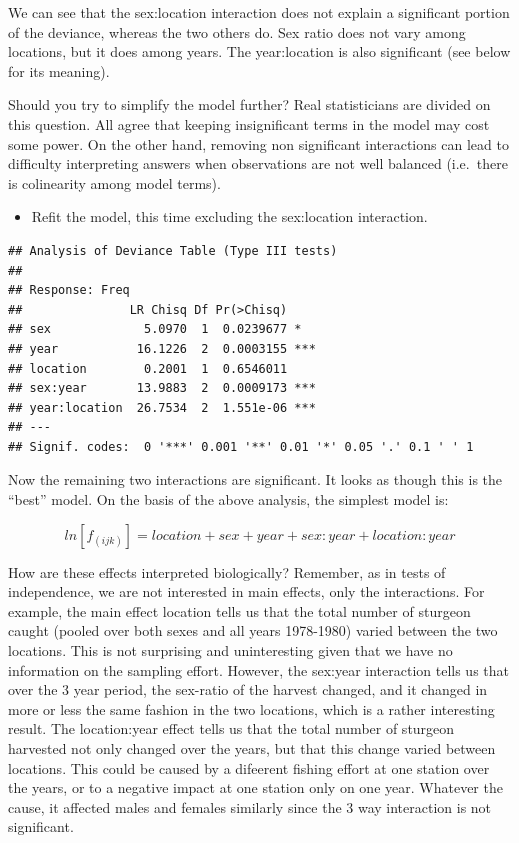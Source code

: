 \documentclass[
  12pt,
]{book}
\providecommand{\tightlist}{%
  \setlength{\itemsep}{0pt}\setlength{\parskip}{0pt}}
\begin{document}
We can see that the sex:location interaction does not explain a significant portion of the deviance, whereas the two others do. Sex ratio does not vary among locations, but it does among years. The year:location is also significant (see below for its meaning).

Should you try to simplify the model further? Real statisticians are divided on this question. All agree that keeping insignificant terms in the model may cost some power. On the other hand, removing non significant interactions can lead to difficulty interpreting answers when observations are not well balanced (i.e.~there is colinearity among model terms).

\begin{itemize}
\tightlist
\item
  Refit the model, this time excluding the sex:location interaction.
\end{itemize}

\begin{verbatim}
## Analysis of Deviance Table (Type III tests)
## 
## Response: Freq
##               LR Chisq Df Pr(>Chisq)    
## sex             5.0970  1  0.0239677 *  
## year           16.1226  2  0.0003155 ***
## location        0.2001  1  0.6546011    
## sex:year       13.9883  2  0.0009173 ***
## year:location  26.7534  2  1.551e-06 ***
## ---
## Signif. codes:  0 '***' 0.001 '**' 0.01 '*' 0.05 '.' 0.1 ' ' 1
\end{verbatim}

Now the remaining two interactions are significant. It looks as though this is the ``best'' model. On the basis of the above analysis, the simplest model is:

\[ln[f_{(ijk)} ] = location + sex + year + sex:year + location:year\]

How are these effects interpreted biologically? Remember, as in tests of independence, we are not interested in main effects, only the interactions. For example, the main effect location tells us that the total number of sturgeon caught (pooled over both sexes and all years 1978-1980) varied between the two locations. This is not surprising and uninteresting given that we have no information on the sampling effort. However, the sex:year interaction tells us that over the 3 year period, the sex-ratio of the harvest changed, and it changed in more or less the same fashion in the two locations, which is a rather interesting result. The location:year effect tells us that the total number of sturgeon harvested not only changed over the years, but that this change varied between locations. This could be caused by a difeerent fishing effort at one station over the years, or to a negative impact at one station only on one year. Whatever the cause, it affected males and females similarly since the 3 way interaction is not significant.
\end{document}
